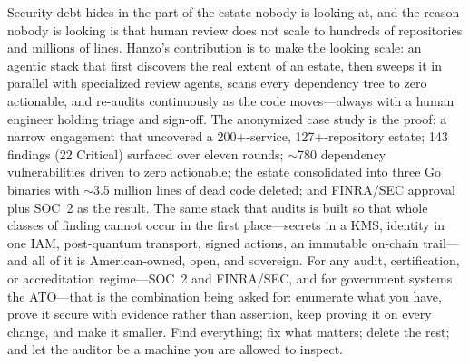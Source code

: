 \documentclass[11pt,letterpaper]{article}
\begin{document}
Security debt hides in the part of the estate nobody is looking at, and the reason
nobody is looking is that human review does not scale to hundreds of repositories
and millions of lines. Hanzo's contribution is to make the looking scale: an
agentic stack that first discovers the real extent of an estate, then sweeps it in
parallel with specialized review agents, scans every dependency tree to zero
actionable, and re-audits continuously as the code moves---always with a human
engineer holding triage and sign-off. The anonymized case study is the proof: a
narrow engagement that uncovered a 200+-service, 127+-repository estate; 143
findings (22 Critical) surfaced over eleven rounds; $\sim$780 dependency
vulnerabilities driven to zero actionable; the estate consolidated into three Go
binaries with $\sim$3.5 million lines of dead code deleted; and FINRA/SEC approval
plus SOC~2 as the result. The same stack that audits is built so that whole
classes of finding cannot occur in the first place---secrets in a KMS, identity in
one IAM, post-quantum transport, signed actions, an immutable on-chain trail---and
all of it is American-owned, open, and sovereign. For any audit, certification, or
accreditation regime---SOC~2 and FINRA/SEC, and for government systems the
ATO---that is the
combination being asked for: enumerate what you have, prove
it secure with evidence rather than assertion, keep proving it on every change,
and make it smaller. Find everything; fix what matters; delete the rest; and let
the auditor be a machine you are allowed to inspect.
\end{document}
